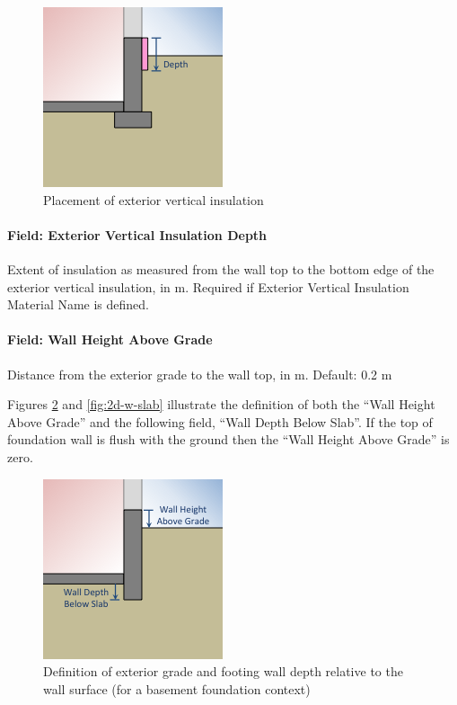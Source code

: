 \begin{figure}
\centering
\includegraphics{media/kiva-2d-evi.png}
\caption{Placement of exterior vertical insulation\label{fig:evi}}
\end{figure}

\paragraph{Field: Exterior Vertical Insulation
Depth}

Extent of insulation as measured from the wall top to the bottom edge of
the exterior vertical insulation, in m. Required if Exterior Vertical
Insulation Material Name is defined.

\paragraph{Field: Wall Height Above
Grade}

Distance from the exterior grade to the wall top, in m. Default: 0.2 m

Figures \ref{fig:2d-w} and \ref{fig:2d-w-slab} illustrate the definition of both the ``Wall
Height Above Grade'' and the following field, ``Wall Depth Below Slab''. If the top of foundation wall is flush with the ground then the ``Wall Height Above Grade'' is zero.

\begin{figure}
\centering
\includegraphics{media/kiva-2d-wall.png}
\caption{Definition of exterior grade and footing wall depth relative to
the wall surface (for a basement foundation context)\label{fig:2d-w}}
\end{figure}


